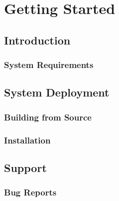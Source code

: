 \part{Getting Started}
\label{part:gettingstarted}
{
\hypersetup{linkcolor=black}
\parttoc
}

\chapter{Introduction}
\label{chapter:introduction}

\section{System Requirements}
\label{section:systemrequirements}


\chapter{System Deployment}
\label{chapter:deployment}
\section{Building from Source}
\label{section:buildingfromsource}

\section{Installation}
\label{section:installation}


\chapter{Support}
\label{chapter:support}


\section{Bug Reports}
\label{section:bugreports}


